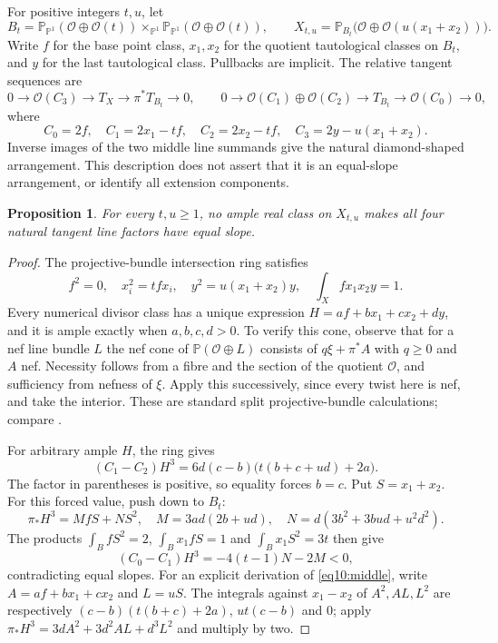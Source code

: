 \documentclass[11pt]{amsart}
\newtheorem{proposition}[theorem]{Proposition}
\theoremstyle{definition}
\theoremstyle{remark}
\newcommand{\PP}{\mathbb P}
\newcommand{\cO}{\mathcal O}
\begin{document}
For positive integers $t,u$, let
\[
 B_t=\PP_{\PP^1}(\cO\oplus\cO(t))
       \times_{\PP^1}\PP_{\PP^1}(\cO\oplus\cO(t)),\qquad
 X_{t,u}=\PP_{B_t}\bigl(\cO\oplus\cO(u(x_1+x_2))\bigr).
\]
Write $f$ for the base point class, $x_1,x_2$ for the quotient
tautological classes on $B_t$, and $y$ for the last tautological
class. Pullbacks are implicit. The relative tangent sequences are
\[
 0\to\cO(C_3)\to T_X\to\pi^*T_{B_t}\to0,\qquad
 0\to\cO(C_1)\oplus\cO(C_2)\to T_{B_t}\to\cO(C_0)\to0,
\]
where
\[
 C_0=2f,\quad C_1=2x_1-tf,\quad C_2=2x_2-tf,\quad
 C_3=2y-u(x_1+x_2).
\]
Inverse images of the two middle line summands give the natural
diamond-shaped arrangement. This description does not assert that
it is an equal-slope arrangement, or identify all extension components.

\begin{proposition}\label{prop10:bott}
For every $t,u\ge1$, no ample real class on $X_{t,u}$ makes all four
natural tangent line factors have equal slope.
\end{proposition}

\begin{proof}
The projective-bundle intersection ring satisfies
\[
 f^2=0,\quad x_i^2=tf x_i,\quad
 y^2=u(x_1+x_2)y,\quad \int_Xfx_1x_2y=1.
\]
Every numerical divisor class has a unique expression
$H=af+bx_1+cx_2+dy$, and it is ample exactly when $a,b,c,d>0$.
To verify this cone, observe that for a nef line bundle $L$ the nef
cone of $\PP(\cO\oplus L)$ consists of $q\xi+\pi^*A$ with
$q\ge0$ and $A$ nef. Necessity follows from a fibre and the section
of the quotient $\cO$, and sufficiency from nefness of $\xi$.
Apply this successively, since every twist here is nef, and take
the interior. These are standard split projective-bundle calculations;
compare \cite[\S2 and Corollary~3.1.2]{khandasgupta2019}.

For arbitrary ample $H$, the ring gives
\begin{equation}\label{eq10:middle}
 (C_1-C_2)H^3=6d(c-b)\bigl(t(b+c+ud)+2a\bigr).
\end{equation}
The factor in parentheses is positive, so equality forces $b=c$.
Put $S=x_1+x_2$. For this forced value, push down to $B_t$:
\[
 \pi_*H^3=MfS+NS^2,\quad
 M=3ad(2b+ud),\quad N=d(3b^2+3bud+u^2d^2).
\]
The products $\int_B fS^2=2$, $\int_Bx_1fS=1$ and
$\int_Bx_1S^2=3t$ then give
\begin{equation}\label{eq10:base}
 (C_0-C_1)H^3=-4(t-1)N-2M<0,
\end{equation}
contradicting equal slopes. For an explicit derivation of
\eqref{eq10:middle}, write $A=af+bx_1+cx_2$ and $L=uS$.
The integrals against $x_1-x_2$ of $A^2,AL,L^2$ are respectively
$(c-b)(t(b+c)+2a)$, $ut(c-b)$ and $0$; apply
$\pi_*H^3=3dA^2+3d^2AL+d^3L^2$ and multiply by two.
\end{proof}
\end{document}

